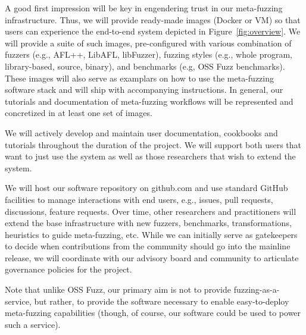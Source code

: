 

A good first impression will be key in engendering trust in our meta-fuzzing infrastructure.
Thus, we will provide ready-made images (Docker or VM) so that users can experience
the end-to-end system depicted in Figure~\ref{fig:overview}.
We will provide a suite of such images, pre-configured with various combination of
fuzzers (e.g., AFL++, LibAFL, libFuzzer), 
fuzzing styles (e.g., whole program, library-based, source, binary), 
and benchmarks (e.g, OSS Fuzz benchmarks).
These images will also serve as examplars on how to use the meta-fuzzing software stack
and will ship with accompanying instructions.
In general, our tutorials and documentation of meta-fuzzing workflows will be
represented and concretized in at least one set of images. 

We will actively develop and maintain user documentation, cookbooks and tutorials throughout
the duration of the project. We will support both users that want to just use the system
as well as those researchers that wish to extend the system.

We will host our software repository on github.com and use standard GitHub facilities
to manage interactions with end users, e.g., issues, pull requests, discussions, feature requests.
Over time, other researchers and practitioners will extend the base infrastructure with
new fuzzers, benchmarks, transformations, heuristics to guide meta-fuzzing, etc. 
While we can initially serve as gatekeepers to decide when contributions from the community
should go into the mainline release, we will coordinate with our advisory board and community to
articulate governance policies for the project.

Note that unlike OSS Fuzz, our primary aim is not to provide fuzzing-as-a-service, but
rather, to provide the software necessary to enable easy-to-deploy meta-fuzzing 
capabilities (though, of course, our software could be used to power such a service).

